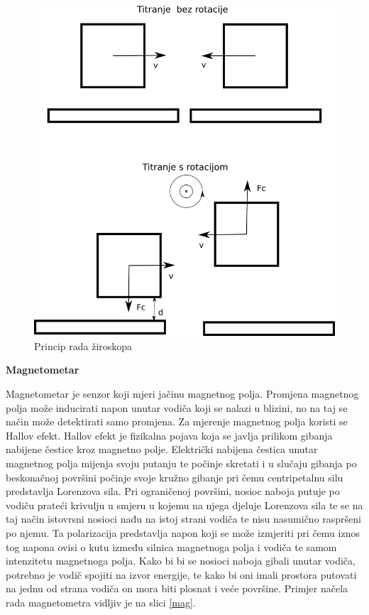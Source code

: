 \documentclass[times, utf8, diplomski]{fer}
\begin{document}
\begin{figure}[h!]
    \includegraphics[width=\textwidth]{gyro.png}
    \caption{Princip rada žiroskopa}
    \label{gyro}
\end{figure}

\textbf{Magnetometar}

Magnetometar je senzor koji mjeri jačinu magnetnog polja. Promjena magnetnog polja može
inducirati napon unutar vodiča koji se nalazi u blizini, no na taj se način može detektirati samo promjena. Za mjerenje magnetnog
polja koristi se Hallov efekt. Hallov efekt je fizikalna pojava koja se javlja prilikom gibanja nabijene čestice kroz magnetno polje.
Električki nabijena čestica unutar magnetnog polja mijenja svoju putanju te počinje skretati i u slučaju gibanja po beskonačnoj
površini počinje svoje kružno gibanje pri čemu centripetalnu silu predstavlja Lorenzova sila. Pri ograničenoj površini, nosioc
naboja putuje po vodiču prateći krivulju u smjeru u kojemu na njega djeluje Lorenzova sila te se na taj način istovrsni nosioci
nađu na istoj strani vodiča te nisu nasumično raspršeni po njemu. Ta polarizacija predstavlja napon koji se može izmjeriti pri
čemu iznos tog napona ovisi o kutu između silnica magnetnoga polja i vodiča te samom intenzitetu magnetnoga polja. Kako bi bi se 
nosioci naboja gibali unutar vodiča, potrebno je vodič spojiti na izvor energije, te kako bi oni imali prostora putovati na 
jednu od strana vodiča on mora biti plosnat i veće površine. Primjer načela rada magnetometra vidljiv je na slici \ref{mag}.
\end{document}
